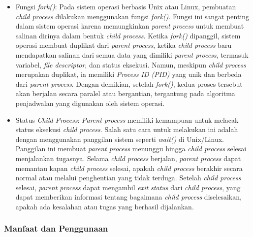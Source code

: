 \documentclass[12pt]{article}
\begin{document}
\begin{itemize}
    \item {Fungsi \textit{fork()}:} Pada sistem operasi berbasis Unix atau Linux, pembuatan \textit{child process} dilakukan menggunakan fungsi \textit{fork()}. Fungsi ini sangat penting dalam sistem operasi karena memungkinkan \textit{parent process} untuk membuat salinan dirinya dalam bentuk \textit{child process}. Ketika \textit{fork()} dipanggil, sistem operasi membuat duplikat dari \textit{parent process}, ketika \textit{child process} baru mendapatkan salinan dari semua data yang dimiliki \textit{parent process}, termasuk variabel, \textit{file descriptor}, dan status eksekusi. Namun, meskipun \textit{child process} merupakan duplikat, ia memiliki \textit{Process ID (PID)} yang unik dan berbeda dari \textit{parent process}. Dengan demikian, setelah \textit{fork()}, kedua proses tersebut akan berjalan secara paralel atau bergantian, tergantung pada algoritma penjadwalan yang digunakan oleh sistem operasi.
    
    \item {Status \textit{Child Process}:} \textit{Parent process} memiliki kemampuan untuk melacak status eksekusi \textit{child process}. Salah satu cara untuk melakukan ini adalah dengan menggunakan panggilan sistem seperti \textit{wait()} di Unix/Linux. Panggilan ini membuat \textit{parent process} menunggu hingga \textit{child process} selesai menjalankan tugasnya. Selama \textit{child process} berjalan, \textit{parent process} dapat memantau kapan \textit{child process} selesai, apakah \textit{child process} berakhir secara normal atau melalui penghentian yang tidak terduga. Setelah \textit{child process} selesai, \textit{parent process} dapat mengambil \textit{exit status} dari \textit{child process}, yang dapat memberikan informasi tentang bagaimana \textit{child process} diselesaikan, apakah ada kesalahan atau tugas yang berhasil dijalankan.
\end{itemize}

\subsubsection{Manfaat dan Penggunaan}
\end{document}
